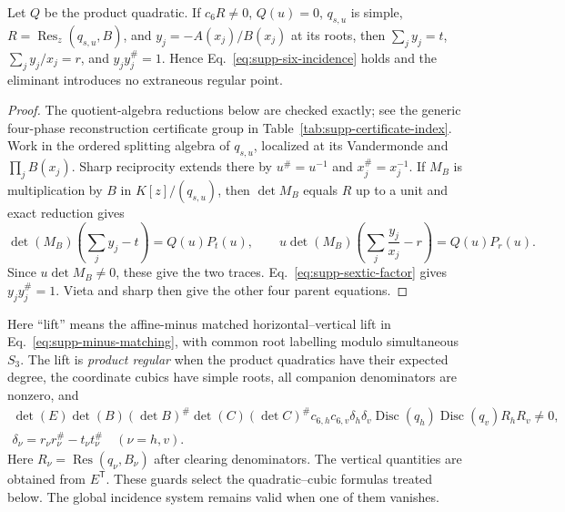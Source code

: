 \begin{lemma}
\label{lem:supp-companion-sufficiency}
{Let $Q$ be the product quadratic.  If $c_6R\ne0$, $Q(u)=0$, $q_{s,u}$ is simple, $R=\operatorname{Res}_z(q_{s,u},B)$, and $y_j=-A(x_j)/B(x_j)$ at its roots, then $\sum_jy_j=t$, $\sum_jy_j/x_j=r$, and $y_jy_j^\#=1$.  Hence Eq.~\eqref{eq:supp-six-incidence} holds and the eliminant introduces no extraneous regular point.}
\end{lemma}

\begin{proof}
The quotient-algebra reductions below are checked exactly; see the generic four-phase reconstruction certificate group in Table~\ref{tab:supp-certificate-index}.
{Work in the ordered splitting algebra of $q_{s,u}$, localized at its Vandermonde and $\prod_jB(x_j)$.  Sharp reciprocity extends there by $u^\#=u^{-1}$ and $x_j^\#=x_j^{-1}$.  If $M_B$ is multiplication by $B$ in $K[z]/(q_{s,u})$, then $\det M_B$ equals $R$ up to a unit and exact reduction gives}
\begin{equation}
{\det(M_B)\left(\sum_jy_j-t\right)=Q(u)P_t(u),
\qquad
u\det(M_B)\left(\sum_j\frac{y_j}{x_j}-r\right)=Q(u)P_r(u).}
\label{eq:supp-companion-remainders}
\end{equation}
{Since $u\det M_B\ne0$, these give the two traces. Eq.~\eqref{eq:supp-sextic-factor} gives $y_jy_j^\#=1$. Vieta and sharp then give the other four parent equations.}
\end{proof}

{Here ``lift'' means the affine-minus matched horizontal--vertical lift in Eq.~\eqref{eq:supp-minus-matching}, with common root labelling modulo simultaneous $S_3$.} The lift is \emph{product regular} when the product quadratics have their expected degree, the coordinate cubics have simple roots, all companion denominators are nonzero, and
\begin{equation}
{\begin{gathered}
\det(E)\det(B)(\det B)^\#\det(C)(\det C)^\#c_{6,h}c_{6,v}
\delta_h\delta_v
{}\operatorname{Disc}(q_h)\operatorname{Disc}(q_v)R_hR_v\ne0,
\\ \delta_\nu=r_\nu r_\nu^\#-t_\nu t_\nu^\#\quad(\nu=h,v).
\end{gathered}}
\label{eq:supp-product-regularity-guards}
\end{equation}
{Here $R_\nu=\operatorname{Res}(q_\nu,B_\nu)$ after clearing denominators.} The vertical quantities are obtained from $E^{\mathsf T}$. These guards select the quadratic--cubic formulas treated below. The global incidence system remains valid when one of them vanishes.

